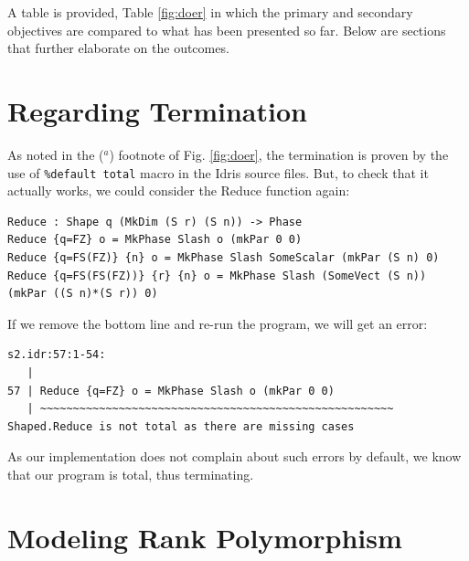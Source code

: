 \documentclass{report}
\begin{document}
A table is provided, Table \ref{fig:doer} in which the primary and secondary objectives are compared to what has been presented so far. Below are sections that further elaborate on the outcomes.

\section{Regarding Termination}
\label{sc:temination}

As noted in the ($^{a}$) footnote of Fig. \ref{fig:doer}, the termination is proven by the use of \verb|%default total| macro in the Idris source files. But, to check that it actually works, we could consider the Reduce function again:

\begin{verbatim}
Reduce : Shape q (MkDim (S r) (S n)) -> Phase
Reduce {q=FZ} o = MkPhase Slash o (mkPar 0 0)
Reduce {q=FS(FZ)} {n} o = MkPhase Slash SomeScalar (mkPar (S n) 0)
Reduce {q=FS(FS(FZ))} {r} {n} o = MkPhase Slash (SomeVect (S n)) (mkPar ((S n)*(S r)) 0)
\end{verbatim}

If we remove the bottom line and re-run the program, we will get an error:

\begin{verbatim}
s2.idr:57:1-54:
   |
57 | Reduce {q=FZ} o = MkPhase Slash o (mkPar 0 0)
   | ~~~~~~~~~~~~~~~~~~~~~~~~~~~~~~~~~~~~~~~~~~~~~~~~~~~~~~
Shaped.Reduce is not total as there are missing cases
\end{verbatim}

As our implementation does not complain about such errors by default, we know that our program is total, thus terminating.

\section{Modeling Rank Polymorphism}
\label{sc:rankpolym}
\end{document}
